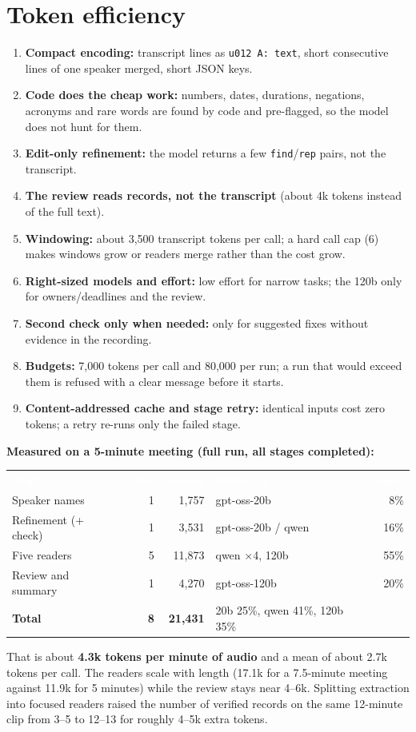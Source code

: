 \documentclass[10pt,a4paper]{article}
\newcommand{\code}[1]{\texttt{\small #1}}
\newcommand{\HC}[1]{\textcolor{white}{\textbf{#1}}}
\begin{document}
\section{Token efficiency}
\begin{enumerate}[label=\textbf{\arabic*.}]
\item \textbf{Compact encoding:} transcript lines as \code{u012 A: text}, short consecutive lines of one speaker merged, short JSON keys.
\item \textbf{Code does the cheap work:} numbers, dates, durations, negations, acronyms and rare words are found by code and pre-flagged, so the model does not hunt for them.
\item \textbf{Edit-only refinement:} the model returns a few \code{find}/\code{rep} pairs, not the transcript.
\item \textbf{The review reads records, not the transcript} (about 4k tokens instead of the full text).
\item \textbf{Windowing:} about 3,500 transcript tokens per call; a hard call cap (6) makes windows grow or readers merge rather than the cost grow.
\item \textbf{Right-sized models and effort:} low effort for narrow tasks; the 120b only for owners/deadlines and the review.
\item \textbf{Second check only when needed:} only for suggested fixes without evidence in the recording.
\item \textbf{Budgets:} 7,000 tokens per call and 80,000 per run; a run that would exceed them is refused with a clear message before it starts.
\item \textbf{Content-addressed cache and stage retry:} identical inputs cost zero tokens; a retry re-runs only the failed stage.
\end{enumerate}

\textbf{Measured on a 5-minute meeting (full run, all stages completed):}
\begin{center}
\begin{tabularx}{0.96\textwidth}{@{}Y r r L{4.6cm} r@{}}
\HC{Stage}&\HC{Calls}&\HC{Tokens}&\HC{Model(s)}&\HC{Share}\\
Speaker names & 1 & 1,757 & gpt-oss-20b & 8\%\\
Refinement (+ check) & 1 & 3,531 & gpt-oss-20b / qwen & 16\%\\
Five readers & 5 & 11,873 & qwen $\times$4, 120b & 55\%\\
Review and summary & 1 & 4,270 & gpt-oss-120b & 20\%\\
\textbf{Total} & \textbf{8} & \textbf{21,431} & 20b 25\%, qwen 41\%, 120b 35\% & \\
\end{tabularx}
\end{center}
That is about \textbf{4.3k tokens per minute of audio} and a mean of about 2.7k tokens per call. The readers scale with length (17.1k for a 7.5-minute meeting against 11.9k for 5 minutes) while the review stays near 4--6k. Splitting extraction into focused readers raised the number of verified records on the same 12-minute clip from 3--5 to 12--13 for roughly 4--5k extra tokens.
\end{document}
